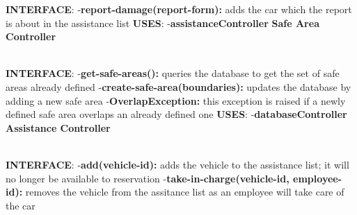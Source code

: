 \documentclass{article}
\begin{document}
\textbf{INTERFACE}: 
 \newline
-\textbf{report-damage(report-form):} adds the car which the report is about in the assistance list   
\newline
\textbf{USES}:   
\newline
-\textbf{assistanceController}
\newpage
\textbf{Safe Area Controller}\\
\begin{figure}[ht]
\end{figure}\\
\textbf{INTERFACE}: 
 \newline
-\textbf{get-safe-areas():} queries the database to get the set of safe areas already defined   
\newline
-\textbf{create-safe-area(boundaries):} updates the database by adding a new safe area
\newline
-\textbf{OverlapException:} this exception is raised if a newly defined safe area overlaps an already defined one
\newline
\textbf{USES}:   
\newline
-\textbf{databaseController}
\newpage
\textbf{Assistance Controller}\\
\begin{figure}[ht]
\end{figure}\\
\textbf{INTERFACE}: 
 \newline
-\textbf{add(vehicle-id):} adds the vehicle to the assistance list; it will no longer be available to reservation  
\newline
-\textbf{take-in-charge(vehicle-id, employee-id):} removes the vehicle from the assitance list as an employee will take care of the car
\newline
\end{document}
